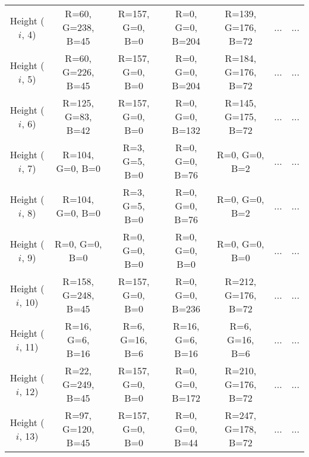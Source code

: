 \documentclass[]{article}
\begin{document}
\begin{table}[H]
\begin{center}
\begin{tabular}{ccccccc}
    			\footnotesize Height ($i$, 4) & \scriptsize R=60, G=238, B=45 & \scriptsize R=157, G=0, B=0 & \scriptsize R=0, G=0, B=204 & \scriptsize R=139, G=176, B=72 & ...& ... \\
    			
    			\footnotesize Height ($i$, 5) & \scriptsize R=60, G=226, B=45 & \scriptsize R=157, G=0, B=0 & \scriptsize R=0, G=0, B=204 & \scriptsize R=184, G=176, B=72 & ... & ...\\
    			
    			\footnotesize Height ($i$, 6) & \scriptsize R=125, G=83, B=42 & \scriptsize R=157, G=0, B=0 & \scriptsize R=0, G=0, B=132 & \scriptsize R=145, G=175, B=72 & ... & ...\\
    			
    			\footnotesize Height ($i$, 7) & \scriptsize R=104, G=0, B=0 & \scriptsize R=3, G=5, B=0 & \scriptsize R=0, G=0, B=76 & \scriptsize R=0, G=0, B=2 & ... & ...\\
    			
    			\footnotesize Height ($i$, 8) & \scriptsize R=104, G=0, B=0 & \scriptsize R=3, G=5, B=0 & \scriptsize R=0, G=0, B=76 & \scriptsize R=0, G=0, B=2 & ...& ... \\
    			
    			\footnotesize Height ($i$, 9) & \scriptsize R=0, G=0, B=0 & \scriptsize R=0, G=0, B=0 & \scriptsize R=0, G=0, B=0 & \scriptsize R=0, G=0, B=0 & ... & ...\\
    			
    			\footnotesize Height ($i$, 10) & \scriptsize R=158, G=248, B=45 & \scriptsize R=157, G=0, B=0 & \scriptsize R=0, G=0, B=236 & \scriptsize R=212, G=176, B=72 & ... & ...\\
    			
    			\footnotesize Height ($i$, 11) & \scriptsize R=16, G=6, B=16 & \scriptsize R=6, G=16, B=6 & \scriptsize R=16, G=6, B=16 & \scriptsize R=6, G=16, B=6 & ... & ...\\
    			
    			\footnotesize Height ($i$, 12) & \scriptsize R=22, G=249, B=45 & \scriptsize R=157, G=0, B=0 & \scriptsize R=0, G=0, B=172 & \scriptsize R=210, G=176, B=72 & ... & ...\\
    			
    			\footnotesize Height ($i$, 13) & \scriptsize R=97, G=120, B=45 & \scriptsize R=157, G=0, B=0 & \scriptsize R=0, G=0, B=44 & \scriptsize R=247, G=178, B=72 & ... & ...\\
    			

\end{tabular}
\end{center}
\end{table}
\end{document}
